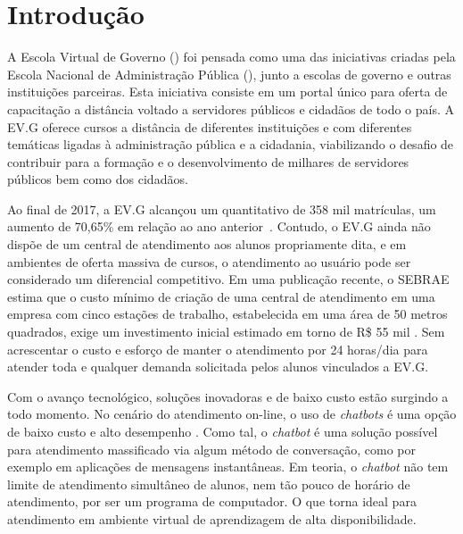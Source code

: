\chapter{Introdução}\label{cap:01:introducao}

A Escola Virtual de Governo () foi pensada como uma das iniciativas criadas pela Escola Nacional de Administração Pública (), junto a escolas de governo e outras instituições parceiras.
Esta iniciativa consiste em um portal único para oferta de capacitação a distância voltado a servidores públicos e cidadãos de todo o país.
A EV.G oferece cursos a distância de diferentes instituições e com diferentes temáticas ligadas à administração pública e a cidadania, viabilizando o desafio de contribuir para a formação e o desenvolvimento de milhares de servidores públicos bem como dos cidadãos.

Ao final de 2017, a EV.G alcançou um quantitativo de 358 mil matrículas, um aumento de 70,65\% em relação ao ano anterior~\cite{EVGnumeros}.
Contudo, o EV.G ainda não dispõe de um central de atendimento aos alunos propriamente dita, e em ambientes de oferta massiva de cursos, o atendimento ao usuário pode ser considerado um diferencial competitivo.
Em uma publicação recente, o SEBRAE estima que o custo mínimo de criação de uma central de atendimento em uma empresa com cinco estações de trabalho, estabelecida em uma área de 50 metros quadrados, exige um investimento inicial estimado em torno de R\$ 55 mil \cite{SebraeCallCenter}.
Sem acrescentar o custo e esforço de manter o atendimento por 24 horas/dia para atender toda e qualquer demanda solicitada pelos alunos vinculados a EV.G.

Com o avanço tecnológico, soluções inovadoras e de baixo custo estão surgindo a todo momento.
No cenário do atendimento on-line, o uso de \textit{chatbots} é uma opção de baixo custo e alto desempenho \cite{CallCenterInf}.
Como tal, o \textit{chatbot} é uma solução possível para atendimento massificado via algum método de conversação, como por exemplo em aplicações de mensagens instantâneas.
Em teoria, o \textit{chatbot} não tem limite de atendimento simultâneo de alunos, nem tão pouco de horário de atendimento, por ser um programa de computador.
O que torna ideal para atendimento em ambiente virtual de aprendizagem de alta disponibilidade.

